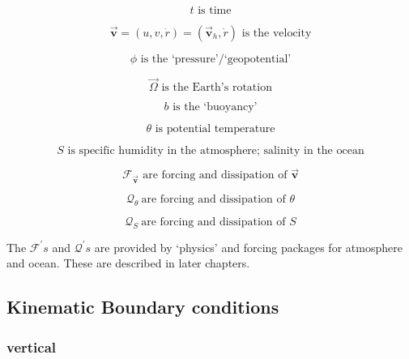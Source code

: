 \begin{equation*}
t\text{ is time}
\end{equation*}

\begin{equation*}
\vec{\mathbf{v}}=(u,v,\dot{r})=(\vec{\mathbf{v}}_{h},\dot{r})\text{ is the
velocity}
\end{equation*}

\begin{equation*}
\phi \text{ is the `pressure'/`geopotential'}
\end{equation*}

\begin{equation*}
\vec{\Omega}\text{ is the Earth's rotation}
\end{equation*}

\begin{equation*}
b\text{ is the `buoyancy'}
\end{equation*}

\begin{equation*}
\theta \text{ is potential temperature}
\end{equation*}

\begin{equation*}
S\text{ is specific humidity in the atmosphere; salinity in the ocean}
\end{equation*}

\begin{equation*}
\mathcal{F}_{\vec{\mathbf{v}}}\text{ are forcing and dissipation of }\vec{
\mathbf{v}}
\end{equation*}

\begin{equation*}
\mathcal{Q}_{\theta }\mathcal{\ }\text{are forcing and dissipation of }\theta
\end{equation*}

\begin{equation*}
\mathcal{Q}_{S}\mathcal{\ }\text{are forcing and dissipation of }S
\end{equation*}

The $\mathcal{F}^{\prime }s$ and $\mathcal{Q}^{\prime }s$ are provided by
`physics' and forcing packages for atmosphere and ocean. These are described
in later chapters.

\subsection{Kinematic Boundary conditions}

\subsubsection{vertical}

